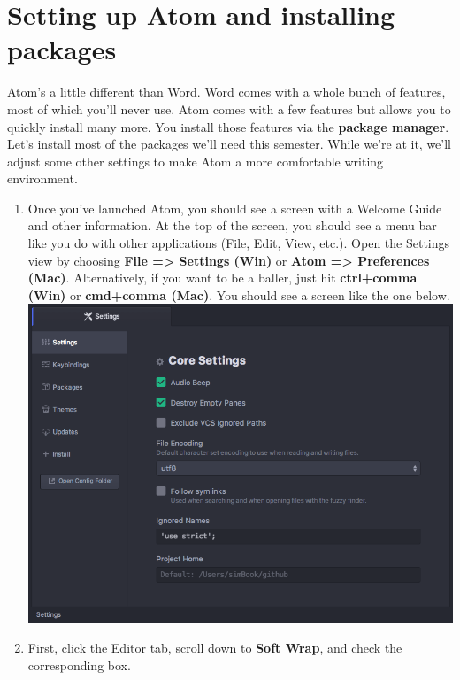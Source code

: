 \documentclass[]{book}
\providecommand{\tightlist}{%
  \setlength{\itemsep}{0pt}\setlength{\parskip}{0pt}}
\theoremstyle{definition}
\theoremstyle{definition}
\theoremstyle{definition}
\theoremstyle{remark}
\begin{document}
\hypertarget{setting-up-atom-and-installing-packages}{%
\section{Setting up Atom and installing
packages}\label{setting-up-atom-and-installing-packages}}

Atom's a little different than Word. Word comes with a whole bunch of
features, most of which you'll never use. Atom comes with a few features
but allows you to quickly install many more. You install those features
via the \textbf{package manager}. Let's install most of the packages
we'll need this semester. While we're at it, we'll adjust some other
settings to make Atom a more comfortable writing environment.

\begin{enumerate}
\def\labelenumi{\arabic{enumi}.}
\tightlist
\item
  Once you've launched Atom, you should see a screen with a Welcome
  Guide and other information. At the top of the screen, you should see
  a menu bar like you do with other applications (File, Edit, View,
  etc.). Open the Settings view by choosing \textbf{File =\textgreater{}
  Settings (Win)} or \textbf{Atom =\textgreater{} Preferences (Mac)}.
  Alternatively, if you want to be a baller, just hit \textbf{ctrl+comma
  (Win)} or \textbf{cmd+comma (Mac)}. You should see a screen like the
  one below.\\
  \includegraphics{atom-settings.png}
\item
  First, click the Editor tab, scroll down to \textbf{Soft Wrap}, and
  check the corresponding box.

\end{enumerate}
\end{document}
